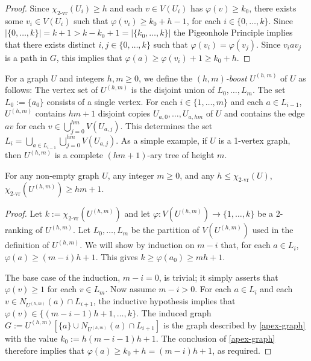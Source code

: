 \documentclass[kpfonts]{patmorin}
\newcommand{\defin}[1]{\emph{\color{brightmaroon}#1}}
\newcommand{\rn}[1]{\chi_{\operatorname{#1-vr}}}
\newcommand{\trn}{\rn{2}}
\theoremstyle{named}
\begin{document}
\begin{proof}
    Since $\trn(U_i)\ge h$ and each $v\in V(U_i)$ has $\varphi(v)\ge k_0$, there exists some $v_i\in V(U_i)$ such that $\varphi(v_i)\ge k_0+h-1$, for each $i\in\{0,\ldots,k\}$.  Since $|\{0,\ldots,k\}|=k+1>k-k_0+1=|\{k_0,\ldots,k\}|$ the Pigeonhole Principle implies that there exists distinct $i,j\in\{0,\ldots,k\}$ such that $\varphi(v_i)=\varphi(v_j)$.  Since $v_i a v_j$ is a path in $G$, this implies that $\varphi(a)\ge \varphi(v_i)+1\ge k_0+h$.
\end{proof}

For a graph $U$ and integers $h,m\ge 0$, we define the \defin{$(h,m)$-boost} $U^{(h,m)}$ of $U$ as follows: The vertex set of $U^{(h,m)}$ is the disjoint union of $L_0,\ldots,L_m$.  The set $L_0:=\{a_0\}$ consists of a single vertex. For each $i\in\{1,\ldots,m\}$ and each $a\in L_{i-1}$, $U^{(h,m)}$ contains $hm+1$ disjoint copies $U_{a,0},\ldots,U_{a,hm}$ of $U$ and contains the edge $av$ for each $v\in\bigcup_{j=0}^{hm} V(U_{a,j})$.  This determines the set $L_i=\bigcup_{a\in L_{i-1}}\bigcup_{j=0}^{hm} V(U_{a,j})$.  As a simple example, if $U$ is a 1-vertex graph, then $U^{(h,m)}$ is a complete $(hm+1)$-ary tree of height $m$.

\begin{lem}\label{boost}
    For any non-empty graph $U$, any integer $m\ge 0$, and any $h\le\trn(U)$, $\trn(U^{(h,m)})\ge hm +1$.
\end{lem}

\begin{proof}
    Let $k:=\trn(U^{(h,m)})$ and let $\varphi:V(U^{(h,m)})\to\{1,\ldots,k\}$ be a 2-ranking of $U^{(h,m)}$.  Let $L_0,\ldots,L_{m}$ be the partition of $V(U^{(h,m)})$ used in the definition of $U^{(h,m)}$. We will show by induction on $m-i$ that, for each $a\in L_{i}$, $\varphi(a)\ge(m-i)h+1$. This gives $k\ge \varphi(a_0)\ge m h+1$.

    The base case of the induction, $m-i=0$, is trivial; it simply asserts that $\varphi(v)\ge 1$ for each $v\in L_m$.  Now assume $m-i > 0$.  For each $a\in L_i$ and each  $v\in N_{U^{(h,m)}}(a)\cap L_{i+1}$, the inductive hypothesis implies that $\varphi(v)\in\{(m-i-1)h+1,\ldots,k\}$.  The induced graph $G:=U^{(h,m)}[\{a\}\cup N_{U^{(h,m)}}(a)\cap L_{i+1}]$ is the graph described by \cref{apex-graph} with the value $k_0:=h(m-i-1)h+1$.  The conclusion of \cref{apex-graph} therefore implies that $\varphi(a)\ge k_0+h=(m-i)h+1$, as required.
\end{proof}
\end{document}
